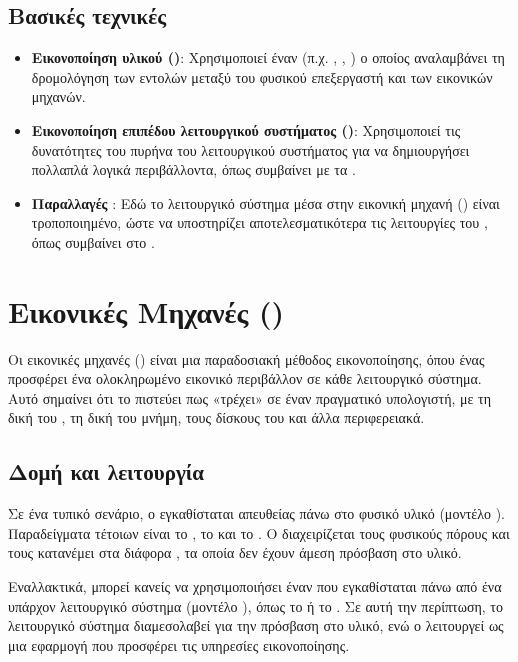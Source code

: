\subsection{Βασικές τεχνικές}

\begin{itemize}
  \item \textbf{Εικονοποίηση υλικού ()}: Χρησιμοποιεί έναν  (π.χ. , , ) ο οποίος αναλαμβάνει τη δρομολόγηση των εντολών μεταξύ του φυσικού επεξεργαστή και των εικονικών μηχανών.
  \item \textbf{Εικονοποίηση επιπέδου λειτουργικού συστήματος ()}: Χρησιμοποιεί τις δυνατότητες του πυρήνα του λειτουργικού συστήματος για να δημιουργήσει πολλαπλά λογικά περιβάλλοντα, όπως συμβαίνει με τα .
  \item \textbf{Παραλλαγές }: Εδώ το λειτουργικό σύστημα μέσα στην εικονική μηχανή () είναι τροποποιημένο, ώστε να υποστηρίζει αποτελεσματικότερα τις λειτουργίες του , όπως συμβαίνει στο .
\end{itemize}

\section{Εικονικές Μηχανές ()}

Οι εικονικές μηχανές () είναι μια παραδοσιακή μέθοδος εικονοποίησης, όπου ένας  προσφέρει ένα ολοκληρωμένο εικονικό  περιβάλλον σε κάθε  λειτουργικό σύστημα. Αυτό σημαίνει ότι το  πιστεύει πως «τρέχει» σε έναν πραγματικό υπολογιστή, με τη δική του , τη δική του μνήμη, τους δίσκους του και άλλα περιφερειακά.

\subsection{Δομή και λειτουργία}

Σε ένα τυπικό σενάριο, ο  εγκαθίσταται απευθείας πάνω στο φυσικό υλικό (μοντέλο ). Παραδείγματα τέτοιων  είναι το , το  και το . Ο  διαχειρίζεται τους φυσικούς πόρους και τους κατανέμει στα διάφορα , τα οποία δεν έχουν άμεση πρόσβαση στο υλικό.

Εναλλακτικά, μπορεί κανείς να χρησιμοποιήσει έναν  που εγκαθίσταται πάνω από ένα υπάρχον λειτουργικό σύστημα (μοντέλο ), όπως το  ή το . Σε αυτή την περίπτωση, το  λειτουργικό σύστημα διαμεσολαβεί για την πρόσβαση στο υλικό, ενώ ο  λειτουργεί ως μια εφαρμογή που προσφέρει τις υπηρεσίες εικονοποίησης.

